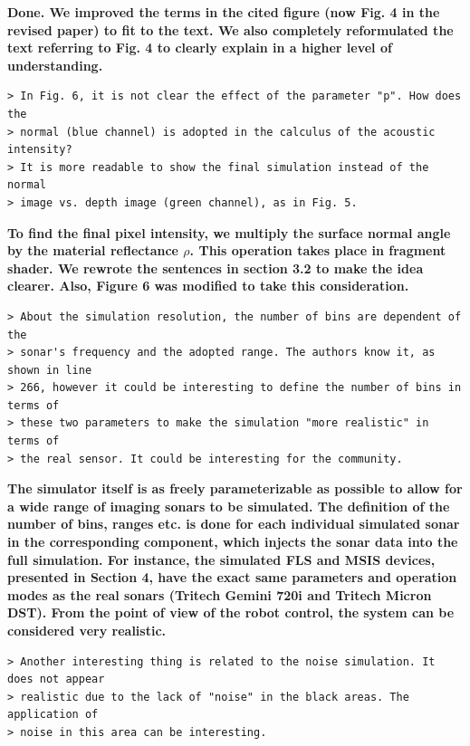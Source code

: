 \documentclass{article}
\begin{document}
\textbf{Done. We improved the terms in the cited figure (now Fig. 4 in the revised paper) to fit to the text. We also completely reformulated the text referring to Fig. 4 to clearly explain in a higher level of understanding.}

\begin{verbatim}
> In Fig. 6, it is not clear the effect of the parameter "p". How does the
> normal (blue channel) is adopted in the calculus of the acoustic intensity?
> It is more readable to show the final simulation instead of the normal
> image vs. depth image (green channel), as in Fig. 5.
\end{verbatim}

\textbf{To find the final pixel intensity, we multiply the surface normal angle by the material reflectance $\rho$. This operation takes place in fragment shader. We rewrote the sentences in section 3.2 to make the idea clearer. Also, Figure 6 was modified to take this consideration.}

\begin{verbatim}
> About the simulation resolution, the number of bins are dependent of the
> sonar's frequency and the adopted range. The authors know it, as shown in line
> 266, however it could be interesting to define the number of bins in terms of
> these two parameters to make the simulation "more realistic" in terms of
> the real sensor. It could be interesting for the community.
\end{verbatim}

\textbf{The simulator itself is as freely parameterizable as possible to allow for a wide range of imaging sonars to be simulated. The definition of the number of bins, ranges etc. is done for each individual simulated sonar in the corresponding component, which injects the sonar data into the full simulation. For instance, the simulated FLS and MSIS devices, presented in Section 4, have the exact same parameters and operation modes as the real sonars (Tritech Gemini 720i and Tritech Micron DST). From the point of view of the robot control, the system can be considered very realistic.}

\begin{verbatim}
> Another interesting thing is related to the noise simulation. It does not appear
> realistic due to the lack of "noise" in the black areas. The application of
> noise in this area can be interesting.
\end{verbatim}
\end{document}
